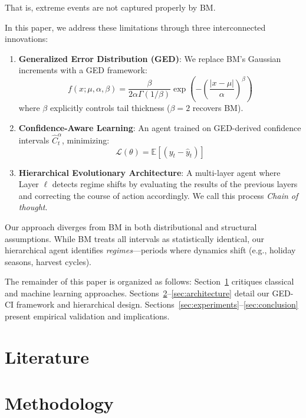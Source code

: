 \documentclass[12pt]{article}
\begin{document}
That is, extreme events are not captured properly by BM.


In this paper, we address these limitations through three interconnected innovations:
\begin{enumerate}
    \item \textbf{Generalized Error Distribution (GED)}: We replace BM's Gaussian increments with a GED framework:
    \begin{equation}
        f(x; \mu, \alpha, \beta) = \frac{\beta}{2\alpha\Gamma(1/\beta)} \exp\left(-\left(\frac{|x-\mu|}{\alpha}\right)^\beta\right)
    \end{equation}
    where $\beta$ explicitly controls tail thickness ($\beta=2$ recovers BM).
    
    \item \textbf{Confidence-Aware Learning}: An agent trained on GED-derived confidence intervals $\hat{C}_t^\alpha$, minimizing:
    \begin{equation}
        \mathscr{L}(\theta) = \mathbb{E}\left[ (y_t - \hat{y}_t) \right]
    \end{equation}
    
\item \textbf{Hierarchical Evolutionary Architecture}: A multi-layer agent where Layer $\ell$ detects regime shifts by evaluating the results of the previous layers and correcting the course of action accordingly. We call this process \emph{Chain of thought}.
\end{enumerate}

Our approach diverges from BM in both distributional and structural assumptions. While BM treats all intervals as statistically identical, our hierarchical agent identifies \emph{regimes}---periods where dynamics shift (e.g., holiday seasons, harvest cycles). 

The remainder of this paper is organized as follows: Section~\ref{sec:literature} critiques classical and machine learning approaches. Sections~\ref{sec:methodology}--\ref{sec:architecture} detail our GED-CI framework and hierarchical design. Sections~\ref{sec:experiments}--\ref{sec:conclusion} present empirical validation and implications.

\section{Literature}
\label{sec:literature}

\section{Methodology}
\label{sec:methodology}
\end{document}
